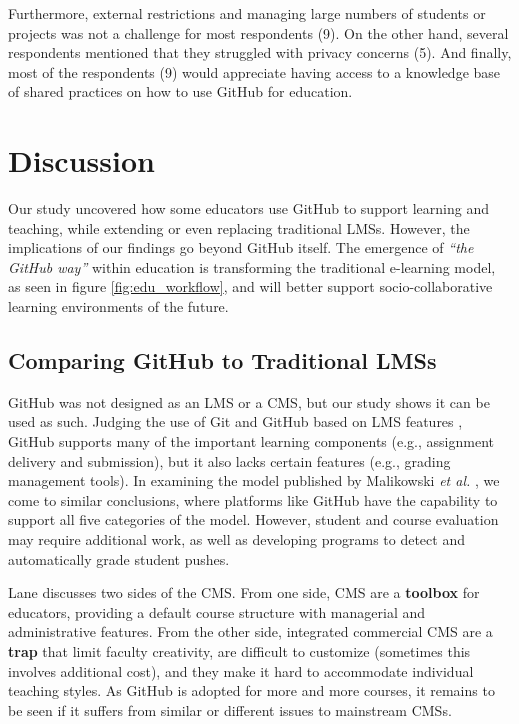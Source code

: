 Furthermore, external restrictions and managing large numbers of students or projects was not a challenge for most respondents (9). On the other hand, several respondents mentioned that they struggled with privacy concerns (5). And finally, most of the respondents (9) would appreciate having access to a knowledge base of shared practices on how to use GitHub for education. 

\section{Discussion}
Our study uncovered how some educators use GitHub to support learning and teaching, while extending or even replacing traditional LMSs. However, the implications of our findings go beyond GitHub itself. The emergence of \textit{``the GitHub way''} within education is transforming the traditional e-learning model, as seen in figure \ref{fig:edu_workflow}, and will better support socio-collaborative learning environments \cite{kreijns2002sociability} of the future.

\subsection{Comparing GitHub to Traditional LMSs}
GitHub was not designed as an LMS or a CMS, but our study shows it can be used as such. Judging the use of Git and GitHub based on LMS features \cite{kumar2011comparative}, GitHub supports many of the important learning components (e.g., assignment delivery and submission), but it also lacks certain features (e.g., grading management tools). In examining the model published by Malikowski \textit{et al.} \cite{malikowski2007model}, we come to similar conclusions, where platforms like GitHub have the capability to support all five categories of the model. However, student and course evaluation may require additional work, as well as developing programs to detect and automatically grade student pushes.

Lane \cite{lane2008toolbox} discusses two sides of the CMS. From one side, CMS are a \textbf{toolbox} for educators, providing a default course structure with managerial and administrative features. From the other side, integrated commercial CMS are a \textbf{trap} that limit faculty creativity, are difficult to customize (sometimes this involves additional cost), and they make it hard to accommodate individual teaching styles. As GitHub is adopted for more and more courses, it remains to be seen if it suffers from similar or different issues to mainstream CMSs.

